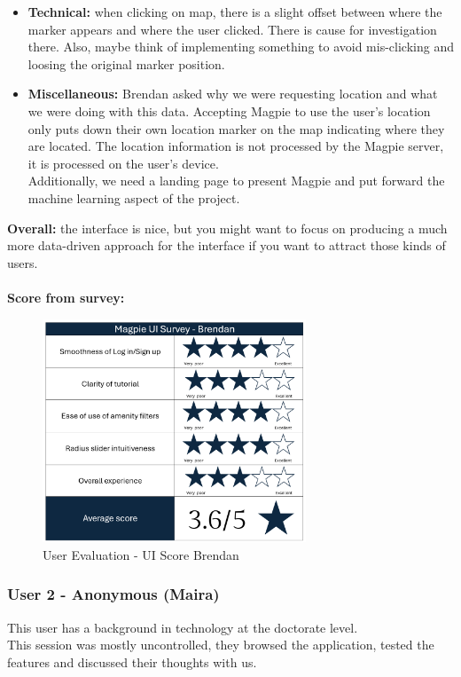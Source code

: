 \begin{itemize}
    \item \textbf{Technical: }when clicking on map, there is a slight offset between where the marker appears and where the user clicked. There is cause for investigation there. Also, maybe think of implementing something to avoid mis-clicking and loosing the original marker position.\\
    \item \textbf{Miscellaneous: }Brendan asked why we were requesting location and what we were doing with this data. Accepting Magpie to use the user's location only puts down their own location marker on the map indicating where they are located. The location information is not processed by the Magpie server, it is processed on the user's device.\\ Additionally, we need a landing page to present Magpie and put forward the machine learning aspect of the project.
\end{itemize}
\textbf{Overall: }the interface is nice, but you might want to focus on producing a much more data-driven approach for the interface if you want to attract those kinds of users.\\ \\
\newpage
\textbf{Score from survey: }
\begin{figure}[h!]
    \centering
    \includegraphics[width=0.7\textwidth]{images/survey-brendan.png}
    \caption{User Evaluation - UI Score Brendan}
\end{figure}

\newpage
\subsubsection{User 2 - Anonymous (Maira)}
This user has a background in technology at the doctorate level.\\
This session was mostly uncontrolled, they browsed the application, tested the features and discussed their thoughts with us.\\

